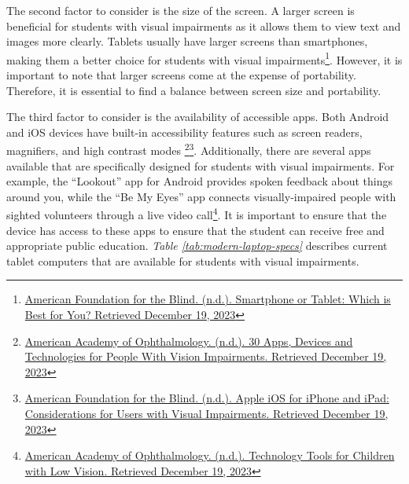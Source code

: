 The second factor to consider is the size of the screen. A larger screen is beneficial for students with visual impairments as it allows them to view text and images more clearly. Tablets usually have larger screens than smartphones, making them a better choice for students with visual impairments\footnote{\raggedright \href{https://www.afb.org/blindness-and-low-vision/using-technology/cell-phones-tablets-mobile/smartphone-or-tablet-which}{American Foundation for the Blind. (n.d.). Smartphone or Tablet: Which is Best for You? Retrieved December 19, 2023}}. However, it is important to note that larger screens come at the expense of portability. Therefore, it is essential to find a balance between screen size and portability.

The third factor to consider is the availability of accessible apps. Both Android and iOS devices have built-in accessibility features such as screen readers, magnifiers, and high contrast modes \footnote{\raggedright \href{https://www.aao.org/eye-health/tips-prevention/low-vision-impairment-apps-tech-assistive-devices }{American Academy of Ophthalmology. (n.d.). 30 Apps, Devices and Technologies for People With Vision Impairments. Retrieved December 19, 2023}}\footnote{\raggedright \href{https://www.afb.org/blindness-and-low-vision/using-technology/cell-phones-tablets-mobile/apple-ios-iphone-and-ipad }{American Foundation for the Blind. (n.d.). Apple iOS for iPhone and iPad: Considerations for Users with Visual Impairments. Retrieved December 19, 2023}}. Additionally, there are several apps available that are specifically designed for students with visual impairments. For example, the “Lookout” app for Android provides spoken feedback about things around you, while the “Be My Eyes” app connects visually-impaired people with sighted volunteers through a live video call\footnote{\raggedright \href{https://www.aao.org/eye-health/tips-prevention/technology-apps-devices-children-blind-low-vision}{American Academy of Ophthalmology. (n.d.). Technology Tools for Children with Low Vision. Retrieved December 19, 2023}}. It is important to ensure that the device has access to these apps to ensure that the student can receive free and appropriate public education.
\emph{Table \ref{tab:modern-laptop-specs}} describes current tablet computers that are available for students with visual impairments.

